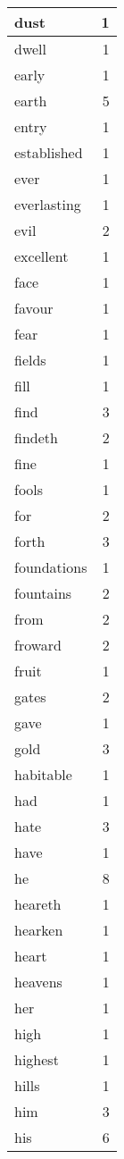 \begin{center}
\begin{longtable}{l|r}
dust & 1\\ \hline 
dwell & 1\\ \hline 
early & 1\\ \hline 
earth & 5\\ \hline 
entry & 1\\ \hline 
established & 1\\ \hline 
ever & 1\\ \hline 
everlasting & 1\\ \hline 
evil & 2\\ \hline 
excellent & 1\\ \hline 
face & 1\\ \hline 
favour & 1\\ \hline 
fear & 1\\ \hline 
fields & 1\\ \hline 
fill & 1\\ \hline 
find & 3\\ \hline 
findeth & 2\\ \hline 
fine & 1\\ \hline 
fools & 1\\ \hline 
for & 2\\ \hline 
forth & 3\\ \hline 
foundations & 1\\ \hline 
fountains & 2\\ \hline 
from & 2\\ \hline 
froward & 2\\ \hline 
fruit & 1\\ \hline 
gates & 2\\ \hline 
gave & 1\\ \hline 
gold & 3\\ \hline 
habitable & 1\\ \hline 
had & 1\\ \hline 
hate & 3\\ \hline 
have & 1\\ \hline 
he & 8\\ \hline 
heareth & 1\\ \hline 
hearken & 1\\ \hline 
heart & 1\\ \hline 
heavens & 1\\ \hline 
her & 1\\ \hline 
high & 1\\ \hline 
highest & 1\\ \hline 
hills & 1\\ \hline 
him & 3\\ \hline 
his & 6\\ \hline 

\end{longtable}
\end{center}
